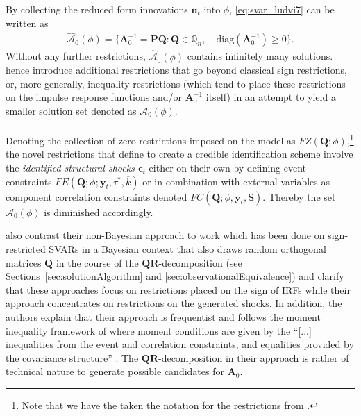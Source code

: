 \documentclass[a4paper,11pt,listof=nochaptergap,oneside,pointednumbers,bibtotoc,bigheadings,liststotoc,hidelinks]{scrbook}
\theoremstyle{mysatz}
\theoremstyle{mydefinition}
\theoremstyle{mytheorem}
\theoremstyle{mybemerkung}
\let\oldhat\hat
\newcommand{\vect}[1]{\boldsymbol{\mathbf{#1}}}
\newcommand{\hatt}[1]{\oldhat{\boldsymbol{\mathbf{#1}}}}
\begin{document}
By collecting the reduced form innovations $\vect{u}_t$ into $\phi$, \ref{eq:svar_ludvi7} can be written as 
\begin{equation} \label{eq:svar_ludvi8}
\begin{split}
 			\hatt{\mathcal{A}}_0(\phi) = \{\vect{A}_0^{-1} = \vect{P}\vect{Q}: \vect{Q} \in \mathbb{Q}_n, \quad \text{diag}(\vect{A}_0^{-1}) \geq 0\}.
\end{split}								
\end{equation}
Without any further restrictions, $\hatt{\mathcal{A}}_0(\phi)$ contains infinitely many solutions. \citet{ludvigsonetal:19} hence introduce additional restrictions that go beyond classical sign restrictions, or, more generally, inequality restrictions (which tend to place these restrictions on the impulse response functions and/or $\vect{A}_0^{-1}$ itself) in an attempt to yield a smaller solution set denoted as $\overline{\mathcal{A}_0}(\phi)$.\\
\\
Denoting the collection of zero restrictions imposed on the model as $FZ(\vect{Q}; \phi)$,\footnote{Note that we have the taken the notation for the restrictions from \citet{ludvigsonetal:17}.} the novel restrictions that \citet{ludvigsonetal:19} define to create a credible identification scheme involve the \textit{identified structural shocks} $\vect{\epsilon}_t$ either on their own by defining event constraints $FE(\vect{Q}; \phi; \vect{y}_t, \tau^*, \overline{k})$ or in combination with external variables as component correlation constraints denoted $FC(\vect{Q}; \phi, \vect{y}_t, \vect{S})$. Thereby the set $\hatt{\mathcal{A}}_0(\phi)$ is diminished accordingly.

\citet{ludvigsonetal:18,ludvigsonetal:19} also contrast their non-Bayesian approach to work which has been done on sign-restricted SVARs in a Bayesian context that also draws random orthogonal matrices $\vect{Q}$ in the course of the $\vect{QR}$-decomposition (see Sections~\ref{sec:solutionAlgorithm} and \ref{sec:observationalEquivalence}) and clarify that these approaches focus on restrictions placed on the sign of IRFs while their approach concentrates on restrictions on the generated shocks. In addition, the authors explain that their approach is frequentist and follows the moment inequality framework of \citet{andrewsandsoares:10} where moment conditions are given by the ``[...] inequalities from the event and correlation constraints, and equalities provided by the covariance structure'' \citet[p. 14]{ludvigsonetal:19}. The $\vect{QR}$-decomposition in their approach is rather of technical nature to generate possible candidates for $\vect{A}_0$.
\end{document}
